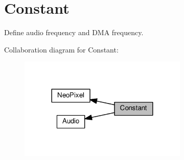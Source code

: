 \hypertarget{group___constant}{}\section{Constant}
\label{group___constant}


Define audio frequency and D\+MA frequency.  


Collaboration diagram for Constant\+:\nopagebreak
\begin{figure}[H]
\begin{center}
\leavevmode
\includegraphics[width=228pt]{df/dbc/group___constant}
\end{center}
\end{figure}
